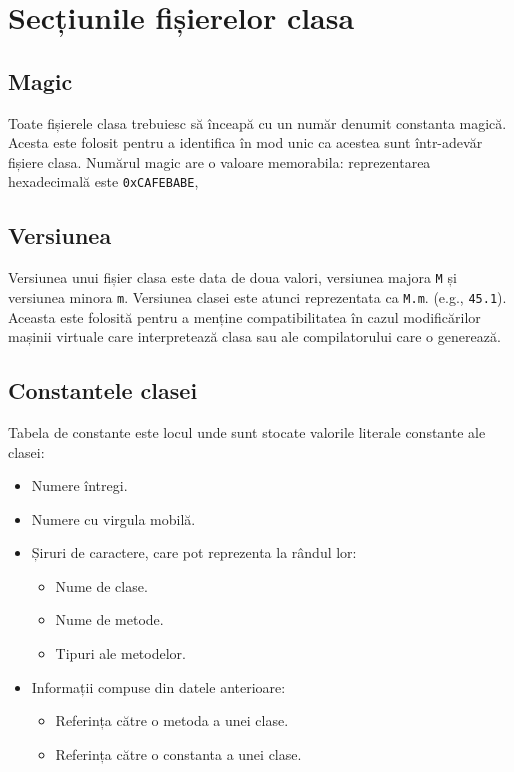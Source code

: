 \section{Secțiunile fișierelor clasa}

\subsection{Magic}

Toate fișierele clasa trebuiesc să înceapă cu un număr denumit constanta
magică. Acesta este folosit pentru a identifica în mod unic ca acestea
sunt într-adevăr fișiere clasa. Numărul magic are o valoare memorabila:
reprezentarea hexadecimală este \texttt{0xCAFEBABE},

\subsection{Versiunea}

Versiunea unui fișier clasa este data de doua valori, versiunea majora
\texttt{M} și versiunea minora \texttt{m}. Versiunea clasei este atunci
reprezentata ca \texttt{M.m}. (e.g., \texttt{45.1}). Aceasta este
folosită pentru a menține compatibilitatea în cazul modificărilor
mașinii virtuale care interpretează clasa sau ale compilatorului care o
generează.

\subsection{Constantele clasei}

Tabela de constante este locul unde sunt stocate valorile literale
constante ale clasei:

\begin{itemize}
	\item Numere întregi.
	\item Numere cu virgula mobilă.
	\item Șiruri de caractere, care pot reprezenta la rândul lor:
	      \begin{itemize}
		      \item Nume de clase.
		      \item Nume de metode.
		      \item Tipuri ale metodelor.
	      \end{itemize}
	\item Informații compuse din datele anterioare:
	      \begin{itemize}
		      \item Referința către o metoda a unei clase.
		      \item Referința către o constanta a unei clase.
	      \end{itemize}
\end{itemize}

